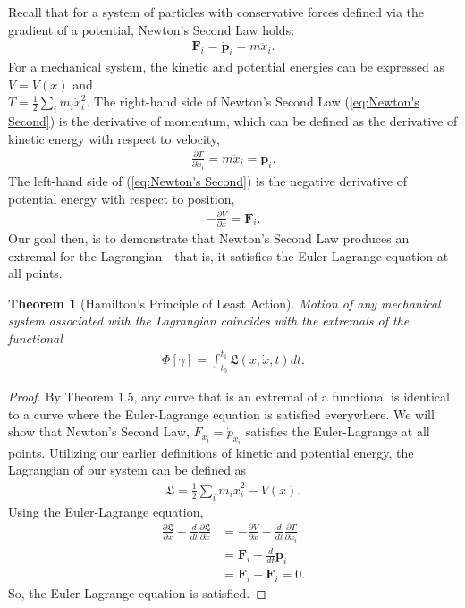 \documentclass[10pt, psamsfonts]{amsart}
\newtheorem{thm}{Theorem}[section]
\theoremstyle{definition}
\theoremstyle{remark}
\numberwithin{equation}{section}
\begin{document}
Recall that for a system of particles with conservative forces defined via the gradient of a potential, Newton's Second Law holds:
\begin{align}
    \label{eq:Newton's Second}
  \bm{F}_i = \dot{\bm{p}}_i = m \ddot{x}_i. 
\end{align}
For a mechanical system, the kinetic and potential energies can be expressed as $V = V(x)$ and \\ $T = \frac{1}{2} \sum_i m_i \dot{x}_i^2$.
The right-hand side of Newton's Second Law (\ref{eq:Newton's Second}) is the derivative of momentum, which can be defined as the derivative of kinetic energy with respect to velocity,
\begin{align*}
  \frac{\partial T }{\partial \dot{x}_i} = m\ddot{x}_i = \bm{p}_i.
\end{align*}
The left-hand side of (\ref{eq:Newton's Second}) is the negative derivative of potential energy with respect to position,
\begin{align*}
  -\frac{\partial V}{\partial x} = \bm{F}_i.
 \end{align*}
Our goal then, is to demonstrate that Newton's Second Law produces an extremal for the Lagrangian - that is, it satisfies the Euler Lagrange equation at all points.

\begin{thm}[Hamilton's Principle of Least Action]
Motion of any mechanical system associated with the Lagrangian coincides with the extremals of the functional
\begin{align*}
  \Phi[\gamma] = \int_{t_0}^{t_1} \mathfrak{L}  (x, \dot{x}, t)dt.
\end{align*}
\end{thm}

\begin{proof}
By Theorem 1.5, any curve that is an extremal of a functional is identical to a curve where the Euler-Lagrange equation is satisfied everywhere. We will show that Newton's Second Law, $F_{x_i} = \dot{p}_{x_i}$ satisfies the Euler-Lagrange at all points. Utilizing our earlier definitions of kinetic and potential energy, the Lagrangian of our system can be defined as
\begin{align*}
  \mathfrak{L} = \frac{1}{2} \sum_i m_i \dot{x}_i^2 - V(x).
\end{align*}
Using the Euler-Lagrange equation,
\begin{align*}
  \frac{\partial \mathfrak{L}}{\partial x} - \frac{d}{dt} \frac{\partial \mathfrak{L}}{\partial \dot{x}} &= -\frac{\partial V}{\partial x} - \frac{d}{dt} \frac{\partial T}{\partial \dot{x}_i}  \\
  &= \bm{F}_i - \frac{d}{dt}\bm{p}_i \\
  &= \bm{F}_i - \bm{F}_i = 0.
\end{align*}
So, the Euler-Lagrange equation is satisfied.
\end{proof}
\end{document}

